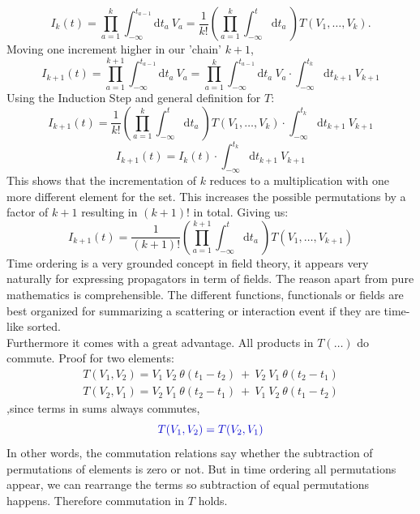 \documentclass[12pt, titlepage]{article}
\begin{document}
\begin{subappendices}
\begin{equation}
I_k (t)
=
 \prod_{a=1}^{k} 
 \int_{-\infty}^{t_{a-1}}\mathrm{d}t_a\
  V_a
=
\dfrac{1}{k!}
 (
 \prod_{a=1}^{k} 
\int_{-\infty}^{t}\mathrm{d}t_a\
)
T(V_1,\ldots,V_k).
\end{equation}
Moving one increment higher in our 'chain' $ k+1 $,
\\
\begin{equation}
I_{k+1} (t)
=
 \prod_{a=1}^{k+1} 
 \int_{-\infty}^{t_{a-1}}\mathrm{d}t_a\
  V_a
  =
   \prod_{a=1}^{k} 
 \int_{-\infty}^{t_{a-1}}\mathrm{d}t_a\
  V_a
  \cdot
 \int_{-\infty}^{t_{k}}\mathrm{d}t_{k+1}\
 V_{k+1}
\end{equation}
Using the Induction Step and general definition for $ T $:
\\
\begin{equation}
I_{k+1} (t)
=
\dfrac{1}{k!}
 (
 \prod_{a=1}^{k} 
\int_{-\infty}^{t}\mathrm{d}t_a\
)
T(V_1,\ldots,V_k)
\cdot
 \int_{-\infty}^{t_{k}}\mathrm{d}t_{k+1}\
 V_{k+1}
\end{equation}
\begin{equation}
I_{k+1} (t)
=
I_k (t)
\cdot
 \int_{-\infty}^{t_{k}}\mathrm{d}t_{k+1}\
 V_{k+1}
\end{equation}
This shows that the incrementation of $ k $ reduces to a multiplication with one more different element for the set. This increases the possible permutations by a factor of $ k+1 $ resulting in $ (k+1)! $ in total. Giving us:
\begin{equation}
I_{k+1}(t)
=
\dfrac{1}{(k+1)!}
 (
 \prod_{a=1}^{k+1} 
\int_{-\infty}^{t}\mathrm{d}t_a\
)
T(V_1,\ldots,V_{k+1})
\end{equation}
Time ordering is a very grounded concept in field theory, it appears very naturally for expressing propagators in term of fields. The reason apart from pure mathematics is comprehensible. The different functions, functionals or fields are best organized for summarizing a scattering or interaction event if they are time-like sorted.
\\
Furthermore it comes with a great advantage. All products in $ T(\ldots) $ do commute. Proof for two elements:
\begin{subequations}
\begin{align}
T(V_1, V_2)=V_1\ V_2\ \theta (t_1 -t_2)\ +\ V_2\  V_1 \ \theta (t_2-t_1)
\\
T(V_2, V_1)=V_2\ V_1\ \theta (t_2 -t_1)\ +\ V_1\  V_2 \ \theta (t_1-t_2)
\end{align}
\end{subequations}
,since terms in sums always commutes,
\begin{equation}\textcolor[RGB]{0,0,204}{
T(V_1, V_2)=T(V_2, V_1)
}
\end{equation}
In other words, the commutation relations say whether the subtraction of permutations of elements is zero or not. But in time ordering all permutations appear, we can rearrange the terms so subtraction of equal permutations happens. Therefore commutation in $ T $ holds.

\end{subappendices}
\end{document}
